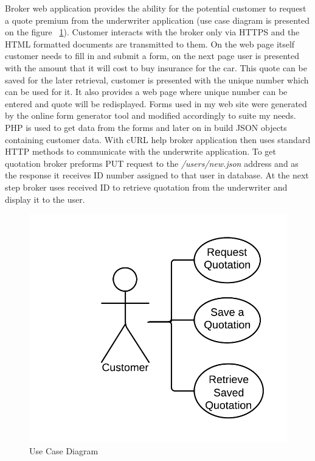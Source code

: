 \documentclass[10pt,a4paper,headinclude=true,twoside]{report}
\begin{document}
Broker web application provides the ability for the potential customer to request a quote premium from the underwriter application (use case diagram is presented on the figure ~\ref{fig:usecase}). Customer interacts with the broker only via HTTPS and the HTML formatted documents are transmitted to them. On the web page itself customer needs to fill in and submit a form, on the next page user is presented with the amount that it will cost to buy insurance for the car. This quote can be saved for the later retrieval, customer is presented with the unique number which can be used for it. It also provides a web page where unique number can be entered and quote will be redisplayed. Forms used in my web site were generated by the online form generator tool and modified accordingly to suite my needs. PHP is used to get data from the forms and later on in build JSON objects containing customer data. With cURL help broker application then uses standard HTTP methods to communicate with the underwrite application. To get quotation broker preforms PUT request to the \textit{/users/new.json} address and as the response it receives ID number assigned to that user in database. At the next step broker uses received ID to retrieve quotation from the underwriter and display it to the user.


\begin{figure}[H]
\centering
\centerline{\includegraphics[scale=0.25]{./usecase}}
\caption{Use Case Diagram}
\label{fig:usecase}
\end{figure} 
\end{document}
